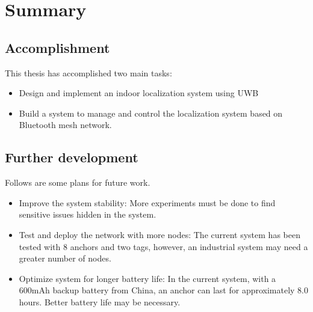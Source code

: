 \documentclass[\main/main.tex]{subfiles}
\begin{document}
\graphicspath{{img/}{summary/img/}}

\chapter{Summary}

\section{Accomplishment}
This thesis has accomplished two main tasks:
\begin{itemize}
    \item Design and implement an indoor localization system using UWB
    \item Build a system to manage and control the localization system based on Bluetooth mesh network.
\end{itemize}

\section{Further development}
Follows are some plans for future work.
\begin{itemize}
    \item Improve the system stability: More experiments must be done to find sensitive issues hidden in the system.
    \item Test and deploy the network with more nodes: The current system has been tested with 8 anchors and two tags, however, an industrial system may need a greater number of nodes.
    \item Optimize system for longer battery life: In the current system, with a 600mAh backup battery from China, an anchor can last for approximately 8.0 hours. Better battery life may be necessary.
\end{itemize}
\end{document}
